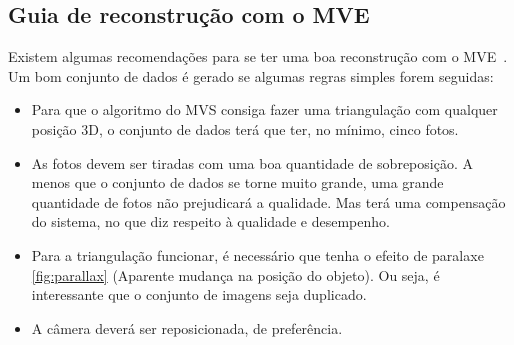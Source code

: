 \subsection*{Guia de reconstrução com o MVE}
Existem algumas recomendações para se ter uma boa reconstrução com o MVE~\cite{pipelinemve,mve}.
Um bom conjunto de dados é gerado se algumas regras simples forem seguidas:

\begin{itemize}

\item{Para que o algoritmo do MVS consiga fazer uma triangulação com qualquer posição 3D, o conjunto de dados terá que ter, no mínimo, cinco fotos.}

\item{As fotos devem ser tiradas com uma boa quantidade de sobreposição. A menos que o conjunto de dados se torne muito grande, uma grande quantidade de fotos não prejudicará a qualidade. 
Mas terá uma compensação do sistema, no que diz respeito à qualidade e desempenho.}

\item{Para a triangulação funcionar, é necessário que tenha o efeito de paralaxe \ref{fig:parallax} (Aparente mudança na posição do objeto). Ou seja, é interessante que o conjunto de imagens seja duplicado.}

\item{A câmera deverá ser reposicionada, de preferência.}

\end{itemize}

